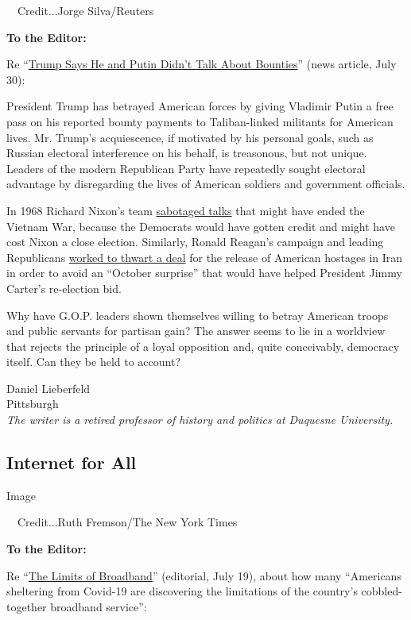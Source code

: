 ~~Credit...Jorge Silva/Reuters

\textbf{To the Editor:}

Re
``\href{https://www.nytimes.com/2020/07/29/us/politics/trump-putin-bounties.html}{Trump
Says He and Putin Didn't Talk About Bounties}'' (news article, July 30):

President Trump has betrayed American forces by giving Vladimir Putin a
free pass on his reported bounty payments to Taliban-linked militants
for American lives. Mr. Trump's acquiescence, if motivated by his
personal goals, such as Russian electoral interference on his behalf, is
treasonous, but not unique. Leaders of the modern Republican Party have
repeatedly sought electoral advantage by disregarding the lives of
American soldiers and government officials.

In 1968 Richard Nixon's team
\href{https://www.nytimes.com/2017/01/02/us/politics/nixon-tried-to-spoil-johnsons-vietnam-peace-talks-in-68-notes-show.html}{sabotaged
talks} that might have ended the Vietnam War, because the Democrats
would have gotten credit and might have cost Nixon a close election.
Similarly, Ronald Reagan's campaign and leading Republicans
\href{https://www.nytimes.com/2019/12/29/world/middleeast/shah-iran-chase-papers.html}{worked
to thwart a deal} for the release of American hostages in Iran in order
to avoid an ``October surprise'' that would have helped President Jimmy
Carter's re-election bid.

Why have G.O.P. leaders shown themselves willing to betray American
troops and public servants for partisan gain? The answer seems to lie in
a worldview that rejects the principle of a loyal opposition and, quite
conceivably, democracy itself. Can they be held to account?

Daniel Lieberfeld\\
Pittsburgh\\
\emph{The writer is a retired professor of history and politics at
Duquesne University.}

\hypertarget{internet-for-all}{%
\subsection{Internet for All}\label{internet-for-all}}

Image

~~Credit...Ruth Fremson/The New York Times

\textbf{To the Editor:}

Re
``\href{https://www.nytimes.com/2020/07/18/opinion/sunday/broadband-internet-access-civil-rights.html?searchResultPosition=2}{The
Limits of Broadband}'' (editorial, July 19), about how many ``Americans
sheltering from Covid-19 are discovering the limitations of the
country's cobbled-together broadband service'':


